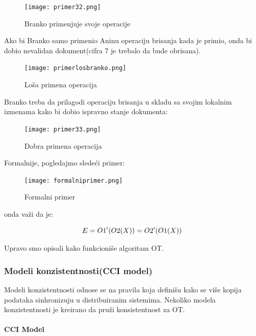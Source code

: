 \documentclass[12pt]{article}
\begin{document}
\begin{figure}[H]
	\centering
	\texttt{[image: primer32.png]}
	\caption{Branko primenjuje svoje operacije}
	
\end{figure}

Ako bi Branko samo primenio Aninu operaciju brisanja kada je primio, onda bi dobio nevalidan dokument(cifra 7 je trebalo da bude obrisana). 

\begin{figure}[H]
	\centering
	\texttt{[image: primerlosbranko.png]}
	\caption{Loša primena operacija}
	
\end{figure}

Branko treba da prilagodi operaciju brisanja u skladu sa svojim lokalnim izmenama kako bi dobio ispravno stanje dokumenta:

\begin{figure}[H]
	\centering
	\texttt{[image: primer33.png]}
	\caption{Dobra primena operacija}
	
\end{figure}

Formalnije, pogledajmo sledeći primer:

\begin{figure}[H]
	\centering
	\texttt{[image: formalniprimer.png]}
	\caption{Formalni primer}
	
\end{figure}

onda važi da je:

\[
	\huge
	E = O1'(O2(X)) = O2'(O1(X))
\]

Upravo smo opisali kako funkcioniše algoritam OT.

\subsubsection{Modeli konzistentnosti(CCI model)}

Modeli konzistentnosti odnose se na pravila koja definišu kako se više kopija podataka sinhronizuju u distribuiranim sistemima. Nekoliko modela konzistentnosti je kreirano da pruži konsistentnost za OT.

\paragraph{CCI Model}
\end{document}
